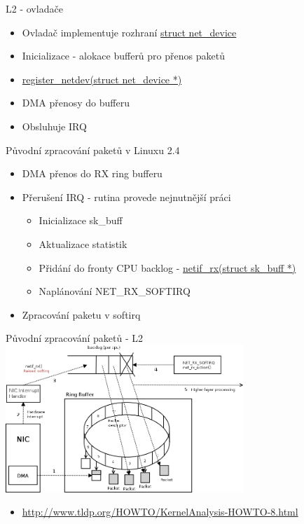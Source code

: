 \documentclass{beamer}
\begin{document}
\begin{frame}{L2 - ovladače}
	\begin{itemize}
		\item Ovladač implementuje rozhraní {\href{http://lxr.free-electrons.com/source/include/linux/netdevice.h?v=4.0\#L1499}{struct net\_device}}
		\item Inicializace - alokace bufferů pro přenos paketů
		\item {\href{http://lxr.free-electrons.com/source/drivers/net/ethernet/intel/e1000e/netdev.c?v=4.0\#L7019}{register\_netdev(struct net\_device *)}}
		\item DMA přenosy do bufferu
		\item Obsluhuje IRQ
	\end{itemize}
\end{frame}

\begin{frame}{Původní zpracování paketů v Linuxu 2.4}
	\begin{itemize}
		\item DMA přenos do RX ring bufferu
		\item Přerušení IRQ - rutina provede nejnutnější práci
		\begin{itemize}
			\item Inicializace sk\_buff
			\item Aktualizace statistik
			\item Přidání do fronty CPU backlog - {\href{http://lxr.free-electrons.com/source/drivers/net/ethernet/3com/3c509.c?v=4.0\#L955}{netif\_rx(struct sk\_buff *)}}
			\item Naplánování NET\_RX\_SOFTIRQ
		\end{itemize}
		\item Zpracování paketu v softirq
	\end{itemize}
\end{frame}

\begin{frame}{Původní zpracování paketů - L2}
	\centering
	\includegraphics[width=9cm,keepaspectratio]{fig/non-napi.png}
	\\
	\begin{itemize}
		\item {\url{http://www.tldp.org/HOWTO/KernelAnalysis-HOWTO-8.html}}
	\end{itemize}
\end{frame}
\end{document}
